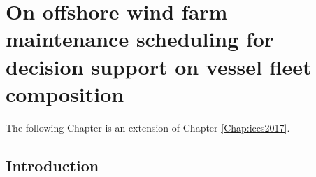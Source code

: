 
\chapter{On offshore wind farm maintenance scheduling for decision support on vessel fleet composition }
\label{Chap:ejor}
\ifpdf
\graphicspath{{X/figures/PNG/}{X/figures/PDF/}{X/figures/}}
\else
\graphicspath{{X/figures/EPS/}{X/figures/}}
\fi

The following Chapter is an extension of Chapter \ref{Chap:iccs2017}.




\section{Introduction}


